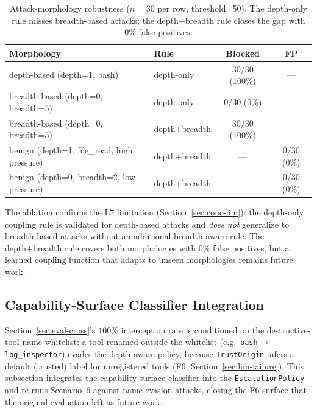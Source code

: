 \begin{table}[t]
\centering
\caption{Attack-morphology robustness ($n=30$ per row, threshold=50).
The depth-only rule misses breadth-based attacks; the depth+breadth
rule closes the gap with $0\%$ false positives.}
\label{tab:ablation-morphology}
\begin{tabular}{llcc}
\toprule
Morphology & Rule & Blocked & FP \\
\midrule
depth-based (depth=1, bash)          & depth-only     & 30/30 (100\%) & --- \\
breadth-based (depth=0, breadth=5)   & depth-only     &  0/30 (\phantom{0}0\%) & --- \\
breadth-based (depth=0, breadth=5)   & depth+breadth  & 30/30 (100\%) & --- \\
benign (depth=1, file\_read, high pressure) & depth+breadth & --- & 0/30 (0\%) \\
benign (depth=0, breadth=2, low pressure)   & depth+breadth & --- & 0/30 (0\%) \\
\bottomrule
\end{tabular}
\end{table}

The ablation confirms the L7 limitation (Section~\ref{sec:conc-lim}):
the depth-only coupling rule is validated for depth-based attacks and
\emph{does not} generalize to breadth-based attacks without an
additional breadth-aware rule. The depth+breadth rule covers both
morphologies with $0\%$ false positives, but a learned coupling
function that adapts to unseen morphologies remains future work.

\subsection{Capability-Surface Classifier Integration}
\label{sec:eval-capability-classifier}

Section~\ref{sec:eval-cross}'s $100\%$ interception rate is conditioned on
the destructive-tool name whitelist: a tool renamed outside the
whitelist (e.g.\ \texttt{bash}$\rightarrow$\texttt{log\_inspector})
evades the depth-aware policy, because \texttt{TrustOrigin} infers a
default (trusted) label for unregistered tools (F6,
Section~\ref{sec:lim-failure}). This subsection integrates the
capability-surface classifier into the \texttt{EscalationPolicy} and
re-runs Scenario~6 against name-evasion attacks, closing the F6
surface that the original evaluation left as future work.

